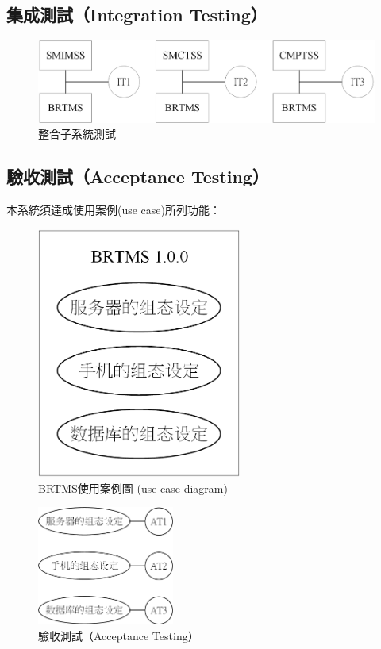  		\subsection{集成測試（Integration Testing）}
 			\begin{figure}[h]
				\centering
				\includegraphics[width = 1\textwidth]{IntegrationTesting.png}
				\caption{整合子系統測試}\label{IntegrationTesting}
			\end{figure}

		\subsection{驗收測試（Acceptance Testing）}
		本系統須達成使用案例(use case)所列功能：
			\begin{figure}[h]
				\centering
				\includegraphics[width = 0.6\textwidth]{usecasediagram.png}
				\caption{BRTMS使用案例圖 (use case diagram)}\label{usecasediagram}
			\end{figure}
			\begin{figure}[h]
				\centering
				\includegraphics[width = 0.4\textwidth]{AcceptanceTesting.png}
				\caption{驗收測試（Acceptance Testing）}\label{AcceptanceTesting}
			\end{figure}





